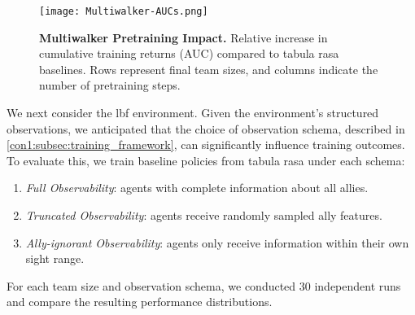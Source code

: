 \begin{figure}[!ht]
    \centering
    \texttt{[image: Multiwalker-AUCs.png]}
    \caption{\textbf{Multiwalker Pretraining Impact.} 
    Relative increase in cumulative training returns (AUC) compared to tabula rasa baselines. 
    Rows represent final team sizes, and columns indicate the number of pretraining steps.}
    \label{con1:fig:multiwalker-aucs}
\end{figure}

We next consider the \gls{lbf} environment.
Given the environment's structured observations, 
we anticipated that the choice of observation schema, 
described in \cref{con1:subsec:training_framework},
can significantly influence training outcomes.
To evaluate this, we train baseline policies from tabula rasa under each schema:
\begin{enumerate}
\item \emph{Full Observability}: agents with complete information about all allies.
\item \emph{Truncated Observability}: agents receive randomly sampled ally features.
\item \emph{Ally-ignorant Observability}: agents only receive information within 
    their own sight range.
\end{enumerate}
For each team size and observation schema, we conducted 30 independent runs
and compare the resulting performance distributions.


